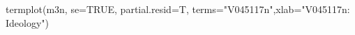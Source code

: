 \begin{Schunk}
\begin{Sinput}
 termplot(m3n, se=TRUE, partial.resid=T, terms="V045117n",xlab="V045117n: Ideology")
\end{Sinput}
\end{Schunk}
